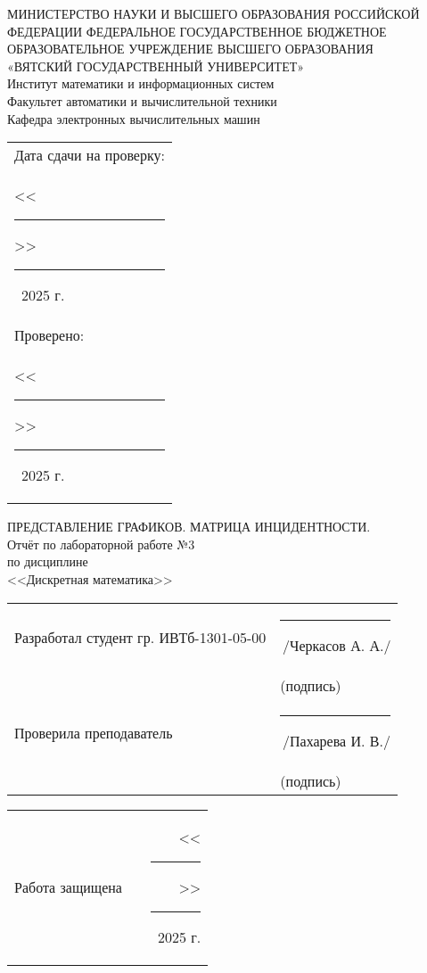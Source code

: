 \documentclass[oneside,a4paper,14pt]{extarticle}
\begin{document}
\newpage
\thispagestyle{empty}
\begin{center}
	МИНИСТЕРСТВО НАУКИ И ВЫСШЕГО ОБРАЗОВАНИЯ РОССИЙСКОЙ ФЕДЕРАЦИИ ФЕДЕРАЛЬНОЕ ГОСУДАРСТВЕННОЕ БЮДЖЕТНОЕ ОБРАЗОВАТЕЛЬНОЕ УЧРЕЖДЕНИЕ ВЫСШЕГО ОБРАЗОВАНИЯ\\
	«ВЯТСКИЙ ГОСУДАРСТВЕННЫЙ УНИВЕРСИТЕТ»\\
	Институт математики и информационных систем\\
	Факультет автоматики и вычислительной техники\\
	Кафедра электронных вычислительных машин
\end{center}
\vspace{10mm}

\hfill
\begin{tabular}{l}
  \footnotesize Дата сдачи на проверку: \\
  \footnotesize <<\rule[-1mm]{5mm}{0.10mm}\/>>\rule[-1mm]{20mm}{0.10mm}\ 2025 г.\\
  \footnotesize Проверено: \\
  \footnotesize <<\rule[-1mm]{5mm}{0.10mm}\/>>\rule[-1mm]{20mm}{0.10mm}\ 2025 г. \\
\end{tabular}
\vfill

\begin{center}
    ПРЕДСТАВЛЕНИЕ ГРАФИКОВ. МАТРИЦА ИНЦИДЕНТНОСТИ.\\
	Отчёт по лабораторной работе №3\\
	по дисциплине\\
	<<Дискретная математика>>\\
\end{center}
\vspace{25mm}
\noindent
\begin{tabular}{ll}
	Разработал студент гр. ИВТб-1301-05-00 & \rule[-1mm]{30mm}{0.10mm}\,/Черкасов А. А./   \\
	                                       & \hspace{8mm}\footnotesize(подпись)            \\
	Проверила преподаватель                & \rule[-1mm]{30mm}{0.10mm}\,/Пахарева И. В./ \\
	                                       & \hspace{8mm}\footnotesize(подпись)            \\
\end{tabular}

\noindent
  \begin{tabular}{lp{58mm}r}
    Работа защищена &  & <<\rule[-1mm]{5mm}{0.10mm}\/>>\rule[-1mm]{30mm}{0.10mm}\ 2025 г.
  \end{tabular}
  \vfill
\end{document}
